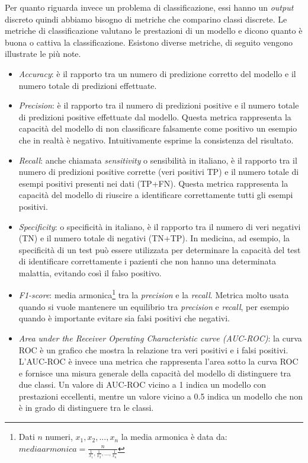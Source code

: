 \documentclass[12pt,italian]{report}
\begin{document}
	Per quanto riguarda invece un problema di classificazione, essi hanno un \textit{output} discreto quindi abbiamo bisogno di metriche che comparino classi discrete. Le metriche di classificazione valutano le prestazioni di un modello e dicono quanto è buona o cattiva la classificazione. Esistono diverse metriche, di seguito vengono illustrate le più note.
	\begin{itemize}
		\item \textit{Accuracy}: è il rapporto tra un numero di predizione corretto del modello e il numero totale di predizioni effettuate.
		
		\item \textit{Precision}: è il rapporto tra il numero di predizioni positive e il numero totale di predizioni positive effettuate dal modello. Questa metrica rappresenta la capacità del modello di non classificare falsamente come positivo un esempio che in realtà è negativo. Intuitivamente esprime la consistenza del risultato.
		
		\item \textit{Recall}: anche chiamata \textit{sensitivity} o sensibilità in italiano, è il rapporto tra il numero di predizioni positive corrette (veri positivi TP) e il numero totale di esempi positivi presenti nei dati (TP+FN). Questa metrica rappresenta la capacità del modello di riuscire a identificare correttamente tutti gli esempi positivi.
		
		\item \textit{Specificity}: o specificità in italiano, è il rapporto tra il numero di veri negativi (TN) e il numero totale di negativi (TN+TP). In medicina, ad esempio, la specificità di un test può essere utilizzata per determinare la capacità del test di identificare correttamente i pazienti che non hanno una determinata malattia, evitando così il falso positivo. 	
			
		\item \textit{F1-score}: media armonica\footnote{Dati $n$ numeri, $x_1, x_2,...,x_n$ la media armonica è data da: $media armonica = \frac{n}{\frac{1}{x_1}, \frac{1}{x_2},...,\frac{1}{x_n}}$} tra la \textit{precision} e la \textit{recall}. Metrica molto usata quando si vuole mantenere un equilibrio tra \textit{precision} e \textit{recall}, per esempio quando è importante evitare sia falsi positivi che negativi.
		
		\label{auroc}
		\item \textit{Area under the Receiver Operating Characteristic curve (AUC-ROC)}: la curva ROC è un grafico che mostra la relazione tra veri positivi e i falsi positivi. L'AUC-ROC è invece una metrica che rappresenta l'area sotto la curva ROC e fornisce una misura generale della capacità del modello di distinguere tra due classi. Un valore di AUC-ROC vicino a 1 indica un modello con prestazioni eccellenti, mentre un valore vicino a 0.5 indica un modello che non è in grado di distinguere tra le classi.
	\end{itemize}
	
\end{document}
